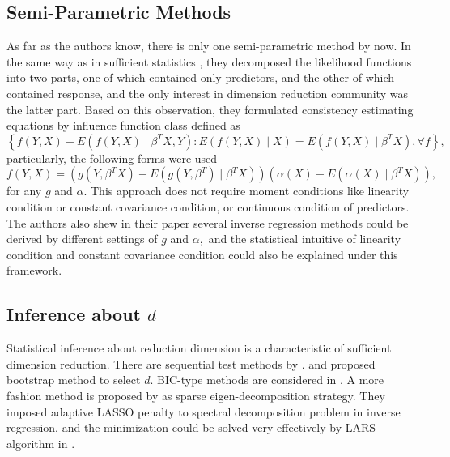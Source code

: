 \subsection{Semi-Parametric Methods}

As far as the authors know, there is only one semi-parametric method
by \citet{ma2012semiparametric} now. In the same way as in sufficient
statistics , they decomposed the likelihood functions into two parts,
one of which contained only predictors, and the other of which contained
response, and the only interest in dimension reduction community was
the latter part. Based on this observation, they formulated consistency
estimating equations by influence function class defined as 
\[
\left\{ f\left(Y,X\right)-E\left(f\left(Y,X\right)\mid\beta^{T}X,Y\right):E\left(f\left(Y,X\right)\mid X\right)=E\left(f\left(Y,X\right)\mid\beta^{T}X\right),\forall f\right\} ,
\]
particularly, the following forms were used 
\[
f\left(Y,X\right)=\left(g\left(Y,\beta^{T}X\right)-E\left(g\left(Y,\beta^{T}\right)\mid\beta^{T}X\right)\right)\left(\alpha\left(X\right)-E\left(\alpha\left(X\right)\mid\beta^{T}X\right)\right),
\]
for any $g$ and $\alpha$. This approach does not require moment
conditions like linearity condition or constant covariance condition,
or continuous condition of predictors. The authors also shew in their
paper several inverse regression methods could be derived by different
settings of $g$ and $\alpha,$ and the statistical intuitive of linearity
condition and constant covariance condition could also be explained
under this framework.


\subsection{Inference about $d$}

Statistical inference about reduction dimension is a characteristic
of sufficient dimension reduction. There are sequential test methods
by \citet{schott1994determining,velilla1998assessing,bura2001extending,cook2001special,cook2004determining,cook2005sufficient}.
\citet{ye2003using} and \citet{zhu2006fourier} proposed bootstrap
method to select $d$. BIC-type methods are considered in \citet{zhu2006sliced,zhu2007kernel,luo2009contour}.
A more fashion method is proposed by \citet{zhu2010sparse} as sparse
eigen-decomposition strategy. They imposed adaptive LASSO penalty
to spectral decomposition problem in inverse regression, and the minimization
could be solved very effectively by LARS algorithm in \citet{efron2004least}. 


